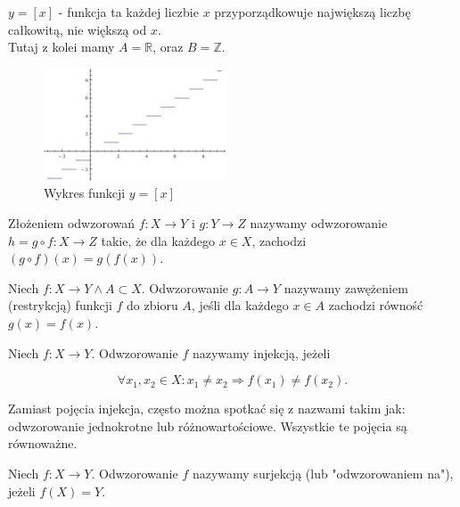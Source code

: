 \begin{przyklad}
$y=[x] $ - funkcja ta każdej liczbie $x$ przyporządkowuje największą liczbę całkowitą, nie większą od $x$.
\\ Tutaj z kolei mamy $A=\mathbb{R} $, oraz $B = \mathbb{Z}$.
\begin{figure}[H]
  \begin{center}
    \includegraphics[width=0.48\textwidth]{./podrozdzial01-obrazki/funkcja-cecha.jpg} %
  \end{center}
  \caption{Wykres funkcji $y=[x]$}
\end{figure}

\end{przyklad}





\begin{definicja}
Złożeniem odwzorowań $f:X\rightarrow Y$ i $g:Y\rightarrow Z$ nazywamy odwzorowanie $h=g\circ f:X\rightarrow Z$ takie, że dla każdego $x \in X$, zachodzi $ (g\circ f)(x)=g(f(x))$.
\end{definicja}
\begin{definicja}
Niech $f:X\rightarrow Y \land A\subset X$. Odwzorowanie $g:A\rightarrow Y$ nazywamy zawężeniem (restrykcją) funkcji $f$ do zbioru $A$, jeśli dla każdego $x \in A$ zachodzi równość  $ g(x) = f(x)$.
\end{definicja}

\begin{definicja}%
Niech $f:X\rightarrow Y$. Odwzorowanie $f$ nazywamy injekcją, jeżeli

$$\forall x_{1},x_{2} \in X : x_{1} \neq x_{2} \Rightarrow f(x_{1}) \neq f(x_{2}) .$$
\end{definicja}

\begin{ozn}
Zamiast pojęcia injekcja, często można spotkać się z nazwami takim jak: odwzorowanie jednokrotne lub różnowartościowe. Wszystkie te pojęcia są równoważne.
\end{ozn}

\begin{definicja}%
Niech $f:X\rightarrow Y$. Odwzorowanie $f$ nazywamy surjekcją (lub "odwzorowaniem na"), jeżeli $f(X)=Y$.
\end{definicja}


